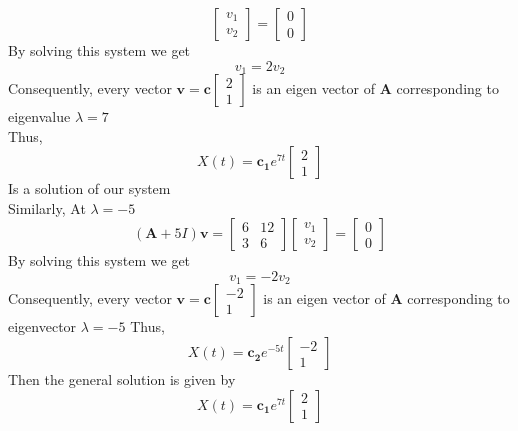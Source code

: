\begin{example}
\[\begin{bmatrix}
            v_{1} \\
            v_{2}
        \end{bmatrix}=
        \begin{bmatrix}
            0 \\
            0
        \end{bmatrix}    
    \]
    By solving this system we get
    \[
        v_1 = 2v_2
    \]
    Consequently, every vector $\mathbf{v} = \mathbf{c}
        \begin{bmatrix}
            2 \\
            1
        \end{bmatrix}
    $ is an eigen vector of $\mathbf{A}$ corresponding to eigenvalue $\lambda = 7$\\
    Thus,
    $$X(t) = \mathbf{c_1} e^{7t} 
        \begin{bmatrix}
            2 \\
            1
        \end{bmatrix}
    $$
    Is a solution of our system\\
    Similarly, At $\lambda = -5$
    $$(\mathbf{A} + 5 I) \mathbf{v} =
        \begin{bmatrix}
            6 & 12 \\
            3 & 6
        \end{bmatrix}
        \begin{bmatrix}
            v_{1} \\
            v_{2}
        \end{bmatrix}=
        \begin{bmatrix}
            0 \\
            0
        \end{bmatrix}
    $$
    By solving this system we get
    \[
        v_1 = -2v_2
    \]
    Consequently, every vector $\mathbf{v} = \mathbf{c}
        \begin{bmatrix}
            -2 \\
            1
        \end{bmatrix}
    $ is an eigen vector of $\mathbf{A}$ corresponding to eigenvector $\lambda =-5$ Thus,
    $$X(t) = \mathbf{c_2}e^{-5t}
        \begin{bmatrix}
            -2 \\
            1
        \end{bmatrix}
    $$
    Then the general solution is given by
    \[
        X(t) =\mathbf{c_1} e^{7t}\begin{bmatrix}
            2 \\1

\end{bmatrix}\]
\end{example}
